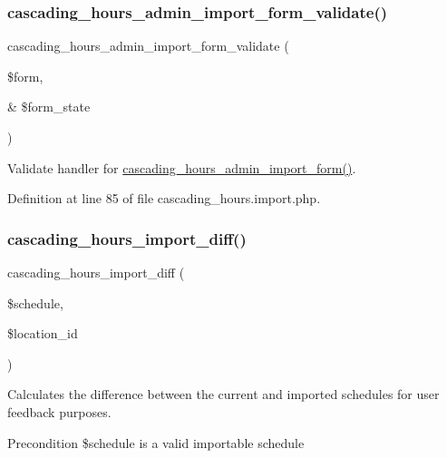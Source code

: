 \subsubsection{\texorpdfstring{cascading\+\_\+hours\+\_\+admin\+\_\+import\+\_\+form\+\_\+validate()}{cascading\_hours\_admin\_import\_form\_validate()}}
{\footnotesize\ttfamily cascading\+\_\+hours\+\_\+admin\+\_\+import\+\_\+form\+\_\+validate (\begin{DoxyParamCaption}\item[{}]{\$form,  }\item[{\&}]{\$form\+\_\+state }\end{DoxyParamCaption})}



Validate handler for \hyperlink{cascading__hours_8import_8php_a7841127be48fe0c9c3fc7193afffd528_a7841127be48fe0c9c3fc7193afffd528}{cascading\+\_\+hours\+\_\+admin\+\_\+import\+\_\+form()}. 



Definition at line 85 of file cascading\+\_\+hours.\+import.\+php.

\mbox{\label{cascading__hours_8import_8php_a9a7dae9ea96d27575e655699a5e89864_a9a7dae9ea96d27575e655699a5e89864}} 
\subsubsection{\texorpdfstring{cascading\+\_\+hours\+\_\+import\+\_\+diff()}{cascading\_hours\_import\_diff()}}
{\footnotesize\ttfamily cascading\+\_\+hours\+\_\+import\+\_\+diff (\begin{DoxyParamCaption}\item[{}]{\$schedule,  }\item[{}]{\$location\+\_\+id }\end{DoxyParamCaption})}



Calculates the difference between the current and imported schedules for user feedback purposes. 

\begin{DoxyPrecond}{Precondition}
\$schedule is a valid importable schedule 
\end{DoxyPrecond}

